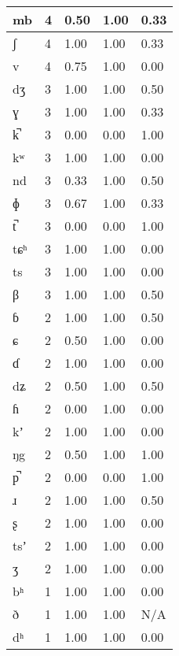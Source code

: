 \begin{longtable}{|l|l|l|l|l|}
mb       & 4     & 0.50    & 1.00   & 0.33  \\ \hline
ʃ        & 4     & 1.00    & 1.00   & 0.33  \\ \hline
v        & 4     & 0.75    & 1.00   & 0.00  \\ \hline
dʒ       & 3     & 1.00    & 1.00   & 0.50  \\ \hline
ɣ        & 3     & 1.00    & 1.00   & 0.33  \\ \hline
k̚       & 3     & 0.00    & 0.00   & 1.00  \\ \hline
kʷ       & 3     & 1.00    & 1.00   & 0.00  \\ \hline
nd       & 3     & 0.33    & 1.00   & 0.50  \\ \hline
ɸ        & 3     & 0.67    & 1.00   & 0.33  \\ \hline
t̚       & 3     & 0.00    & 0.00   & 1.00  \\ \hline
tɕʰ      & 3     & 1.00    & 1.00   & 0.00  \\ \hline
ts       & 3     & 1.00    & 1.00   & 0.00  \\ \hline
β        & 3     & 1.00    & 1.00   & 0.50  \\ \hline
ɓ        & 2     & 1.00    & 1.00   & 0.50  \\ \hline
ɕ        & 2     & 0.50    & 1.00   & 0.00  \\ \hline
ɗ        & 2     & 1.00    & 1.00   & 0.00  \\ \hline
dʑ       & 2     & 0.50    & 1.00   & 0.50  \\ \hline
ɦ        & 2     & 0.00    & 1.00   & 0.00  \\ \hline
kʼ       & 2     & 1.00    & 1.00   & 0.00  \\ \hline
ŋg       & 2     & 0.50    & 1.00   & 1.00  \\ \hline
p̚       & 2     & 0.00    & 0.00   & 1.00  \\ \hline
ɹ        & 2     & 1.00    & 1.00   & 0.50  \\ \hline
ʂ        & 2     & 1.00    & 1.00   & 0.00  \\ \hline
tsʼ      & 2     & 1.00    & 1.00   & 0.00  \\ \hline
ʒ        & 2     & 1.00    & 1.00   & 0.00  \\ \hline
bʰ       & 1     & 1.00    & 1.00   & 0.00  \\ \hline
ð        & 1     & 1.00    & 1.00   & N/A   \\ \hline
dʰ       & 1     & 1.00    & 1.00   & 0.00  \\ \hline

\end{longtable}
